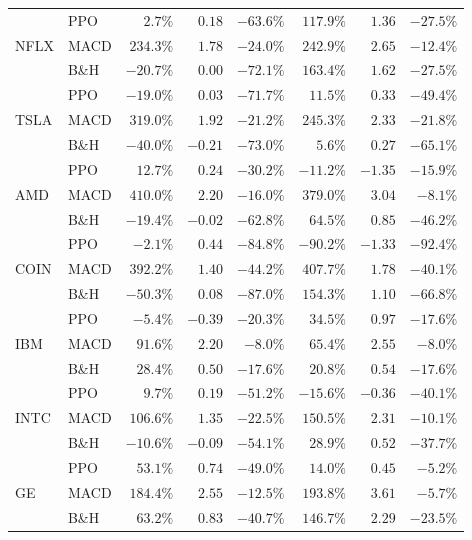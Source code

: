 \documentclass[12pt,a4paper]{article}
\begin{document}
\begin{tabular}{llrrrrrr}
\midrule
\multirow{3}{*}{NFLX}
  & PPO   & \cellcolor{wingreen}$2.7\%$ & \cellcolor{wingreen}$0.18$ & \cellcolor{wingreen}$-63.6\%$ & $117.9\%$ & $1.36$ & $-27.5\%$ \\
  & MACD  & $234.3\%$ & $1.78$ & $-24.0\%$ & $242.9\%$ & $2.65$ & $-12.4\%$ \\
  & B\&H  & $-20.7\%$ & $0.00$ & $-72.1\%$ & $163.4\%$ & $1.62$ & $-27.5\%$ \\
\midrule
\multirow{3}{*}{TSLA}
  & PPO   & \cellcolor{wingreen}$-19.0\%$ & \cellcolor{wingreen}$0.03$ & \cellcolor{wingreen}$-71.7\%$ & \cellcolor{wingreen}$11.5\%$ & \cellcolor{wingreen}$0.33$ & \cellcolor{wingreen}$-49.4\%$ \\
  & MACD  & $319.0\%$ & $1.92$ & $-21.2\%$ & $245.3\%$ & $2.33$ & $-21.8\%$ \\
  & B\&H  & $-40.0\%$ & $-0.21$ & $-73.0\%$ & $5.6\%$ & $0.27$ & $-65.1\%$ \\
\midrule
\multirow{3}{*}{AMD}
  & PPO   & \cellcolor{wingreen}$12.7\%$ & \cellcolor{wingreen}$0.24$ & \cellcolor{wingreen}$-30.2\%$ & $-11.2\%$ & $-1.35$ & $-15.9\%$ \\
  & MACD  & $410.0\%$ & $2.20$ & $-16.0\%$ & $379.0\%$ & $3.04$ & $-8.1\%$ \\
  & B\&H  & $-19.4\%$ & $-0.02$ & $-62.8\%$ & $64.5\%$ & $0.85$ & $-46.2\%$ \\
\midrule
\multirow{3}{*}{COIN}
  & PPO   & \cellcolor{wingreen}$-2.1\%$ & \cellcolor{wingreen}$0.44$ & \cellcolor{wingreen}$-84.8\%$ & $-90.2\%$ & $-1.33$ & $-92.4\%$ \\
  & MACD  & $392.2\%$ & $1.40$ & $-44.2\%$ & $407.7\%$ & $1.78$ & $-40.1\%$ \\
  & B\&H  & $-50.3\%$ & $0.08$ & $-87.0\%$ & $154.3\%$ & $1.10$ & $-66.8\%$ \\
\midrule
\multirow{3}{*}{IBM}
  & PPO   & $-5.4\%$ & $-0.39$ & $-20.3\%$ & \cellcolor{wingreen}$34.5\%$ & \cellcolor{wingreen}$0.97$ & \cellcolor{wingreen}$-17.6\%$ \\
  & MACD  & $91.6\%$ & $2.20$ & $-8.0\%$ & $65.4\%$ & $2.55$ & $-8.0\%$ \\
  & B\&H  & $28.4\%$ & $0.50$ & $-17.6\%$ & $20.8\%$ & $0.54$ & $-17.6\%$ \\
\midrule
\multirow{3}{*}{INTC}
  & PPO   & \cellcolor{wingreen}$9.7\%$ & \cellcolor{wingreen}$0.19$ & \cellcolor{wingreen}$-51.2\%$ & $-15.6\%$ & $-0.36$ & $-40.1\%$ \\
  & MACD  & $106.6\%$ & $1.35$ & $-22.5\%$ & $150.5\%$ & $2.31$ & $-10.1\%$ \\
  & B\&H  & $-10.6\%$ & $-0.09$ & $-54.1\%$ & $28.9\%$ & $0.52$ & $-37.7\%$ \\
\midrule
\multirow{3}{*}{GE}
  & PPO   & \cellcolor{wingreen}$53.1\%$ & \cellcolor{wingreen}$0.74$ & \cellcolor{wingreen}$-49.0\%$ & $14.0\%$ & $0.45$ & $-5.2\%$ \\
  & MACD  & $184.4\%$ & $2.55$ & $-12.5\%$ & $193.8\%$ & $3.61$ & $-5.7\%$ \\
  & B\&H  & $63.2\%$ & $0.83$ & $-40.7\%$ & $146.7\%$ & $2.29$ & $-23.5\%$ \\
\bottomrule
\end{tabular}
\end{document}

